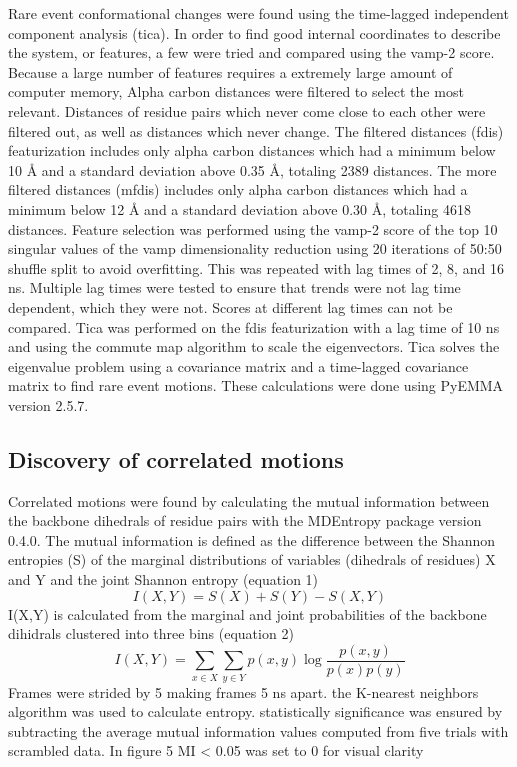 \documentclass{biophys-new}
\begin{document}
Rare event conformational changes were found using the time-lagged independent component analysis (tica).\cite{perez2013identification,schwantes2013improvements} In order to find good internal coordinates to describe the system, or features, a few were tried and compared using the vamp-2 score.\cite{wu2020variational, scherer2019variational} Because a large number of features requires a extremely large amount of computer memory, Alpha carbon distances were filtered to select the most relevant. Distances of residue pairs which never come close to each other were filtered out, as well as distances which never change. The filtered distances (fdis) featurization includes only alpha carbon distances which had a minimum below 10 Å and a standard deviation above 0.35 Å, totaling 2389 distances. The more filtered distances (mfdis) includes only alpha carbon distances which had a minimum below 12 Å and a standard deviation above 0.30 Å, totaling 4618 distances. Feature selection was performed using the vamp-2 score\cite{wu2020variational, scherer2019variational} of the top 10 singular values of the vamp dimensionality reduction using 20 iterations of 50:50 shuffle split to avoid overfitting. This was repeated with lag times of 2, 8, and 16 ns. Multiple lag times were tested to ensure that trends were not lag time dependent, which they were not. Scores at different lag times can not be compared.\cite{husic2017note} Tica was performed on the fdis featurization with a lag time of 10 ns and using the commute map algorithm to scale the eigenvectors.\cite{noe2016commute} Tica solves the eigenvalue problem using a covariance matrix and a time-lagged covariance matrix to find rare event motions. These calculations were done using PyEMMA version 2.5.7. \cite{scherer2015pyemma}

\subsection*{Discovery of correlated motions}

Correlated motions were found by calculating the mutual information between the backbone dihedrals of residue pairs with the MDEntropy package version 0.4.0.\cite{mdentropy} The mutual information is defined as the difference between the Shannon entropies (S) of the marginal distributions of variables (dihedrals of residues) X and Y and the joint Shannon entropy (equation 1)
\begin{equation}
I(X, Y)=S(X)+S(Y)-S(X, Y)
\end{equation}
I(X,Y) is calculated from the marginal and joint probabilities of the backbone dihidrals clustered into three bins (equation 2)
\begin{equation}
I(X, Y)=\sum_{x \in X} \sum_{y \in Y} p(x, y) \log \frac{p(x, y)}{p(x) p(y)}
\end{equation}
Frames were strided by 5 making frames 5 ns apart. the K-nearest neighbors algorithm was used to calculate entropy. statistically significance was ensured by subtracting the average mutual information values computed from five trials with scrambled data. In figure 5 MI < 0.05 was set to 0 for visual clarity
\end{document}
